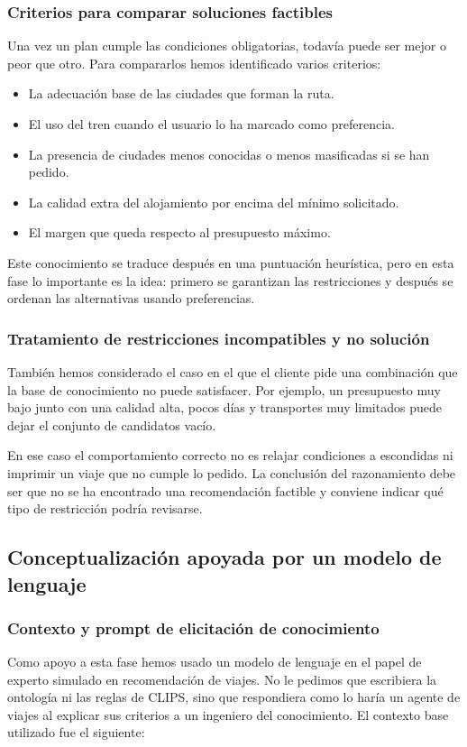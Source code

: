 \documentclass[11pt,a4paper]{article}
\begin{document}
\subsubsection{Criterios para comparar soluciones factibles}
Una vez un plan cumple las condiciones obligatorias, todav\'ia puede ser mejor
o peor que otro. Para compararlos hemos identificado varios criterios:
\begin{itemize}
    \item La adecuaci\'on base de las ciudades que forman la ruta.
    \item El uso del tren cuando el usuario lo ha marcado como preferencia.
    \item La presencia de ciudades menos conocidas o menos masificadas si se
    han pedido.
    \item La calidad extra del alojamiento por encima del m\'inimo solicitado.
    \item El margen que queda respecto al presupuesto m\'aximo.
\end{itemize}

Este conocimiento se traduce despu\'es en una puntuaci\'on heur\'istica, pero en
esta fase lo importante es la idea: primero se garantizan las restricciones y
despu\'es se ordenan las alternativas usando preferencias.

\subsubsection{Tratamiento de restricciones incompatibles y no soluci\'on}
Tambi\'en hemos considerado el caso en el que el cliente pide una combinaci\'on
que la base de conocimiento no puede satisfacer. Por ejemplo, un presupuesto
muy bajo junto con una calidad alta, pocos d\'ias y transportes muy limitados
puede dejar el conjunto de candidatos vac\'io.

En ese caso el comportamiento correcto no es relajar condiciones a escondidas
ni imprimir un viaje que no cumple lo pedido. La conclusi\'on del razonamiento
debe ser que no se ha encontrado una recomendaci\'on factible y conviene
indicar qu\'e tipo de restricci\'on podr\'ia revisarse.

\subsection{Conceptualizaci\'on apoyada por un modelo de lenguaje}
\subsubsection{Contexto y prompt de elicitaci\'on de conocimiento}
Como apoyo a esta fase hemos usado un modelo de lenguaje en el papel de
experto simulado en recomendaci\'on de viajes. No le pedimos que escribiera la
ontolog\'ia ni las reglas de CLIPS, sino que respondiera como lo har\'ia un
agente de viajes al explicar sus criterios a un ingeniero del conocimiento.
El contexto base utilizado fue el siguiente:
\end{document}
